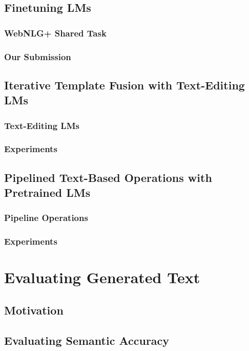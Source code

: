 \documentclass[12pt,notitlepage,a4paper,openright]{report}
\begin{document}
\section{Finetuning LMs}
\label{sec:finetuning}
\subsection{WebNLG+ Shared Task}
\label{sec:webnlgp}
\subsection{Our Submission}
\label{sec:mbart}
\section{Iterative Template Fusion with Text-Editing LMs}
\label{sec:iterative}
\subsection{Text-Editing LMs}
\label{sec:text-editing}
\subsection{Experiments}
\label{sec:text-editing-exp}
\section{Pipelined Text-Based Operations with Pretrained LMs}
\label{sec:pipeline}
\subsection{Pipeline Operations}
\label{sec:pipeline-ops}
\subsection{Experiments}
\label{sec:pipeline-exp}

\chapter{Evaluating Generated Text}
\label{chap:evaluation}
\section{Motivation}
\label{sec:evalution-mot}
\section{Evaluating Semantic Accuracy}
\label{sec:sem-acc}
\end{document}
